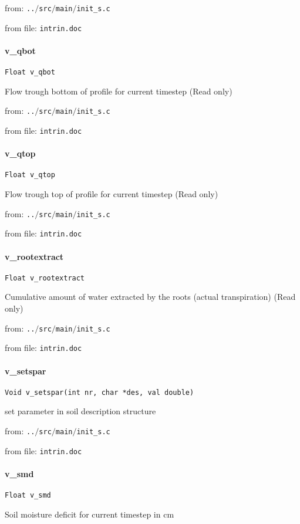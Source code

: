 from: {\tt ..$/$src$/$main$/$init\_s.c}

from file: {\tt intrin.doc}


\paragraph{v\_qbot}
\begin{verbatim}
Float v_qbot
\end{verbatim}
Flow trough bottom of profile for current timestep (Read only)


from: {\tt ..$/$src$/$main$/$init\_s.c}

from file: {\tt intrin.doc}


\paragraph{v\_qtop}
\begin{verbatim}
Float v_qtop
\end{verbatim}
Flow trough top of profile for current timestep (Read only) 


from: {\tt ..$/$src$/$main$/$init\_s.c}

from file: {\tt intrin.doc}


\paragraph{v\_rootextract}
\begin{verbatim}
Float v_rootextract
\end{verbatim}
Cumulative amount of water extracted by the roots (actual
transpiration) (Read only) 


from: {\tt ..$/$src$/$main$/$init\_s.c}

from file: {\tt intrin.doc}


\paragraph{v\_setspar}
\begin{verbatim}
Void v_setspar(int nr, char *des, val double)
\end{verbatim}
set parameter in soil description structure


from: {\tt ..$/$src$/$main$/$init\_s.c}

from file: {\tt intrin.doc}


\paragraph{v\_smd}
\begin{verbatim}
Float v_smd
\end{verbatim}
Soil moisture deficit for current timestep in cm 


